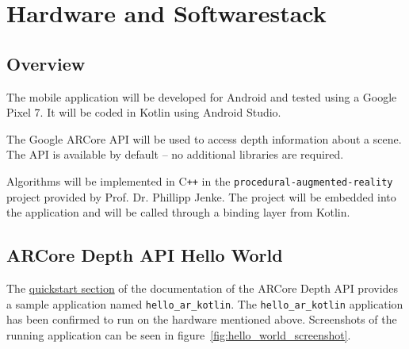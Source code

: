 \chapter{Hardware and Softwarestack}\label{ch:hardware-and-softwarestack}


\section{Overview}

The mobile application will be developed for Android and tested using a Google Pixel 7.
It will be coded in Kotlin using Android Studio.

The Google ARCore API will be used to access depth information about a scene.
The API is available by default -- no additional libraries are required.

Algorithms will be implemented in C\texttt{++} in the \texttt{procedural-augmented-reality} project provided by Prof. Dr. Phillipp Jenke.
The project will be embedded into the application and will be called through a binding layer from Kotlin.


\section{ARCore Depth API Hello World}

The \href{https://developers.google.com/ar/develop/java/depth/quickstart}{quickstart section} of the documentation of
the ARCore Depth API provides a sample application named \texttt{hello\_ar\_kotlin}.
The \texttt{hello\_ar\_kotlin} application has been confirmed to run on the hardware mentioned above.
Screenshots of the running application can be seen in figure~\ref{fig:hello_world_screenshot}.


